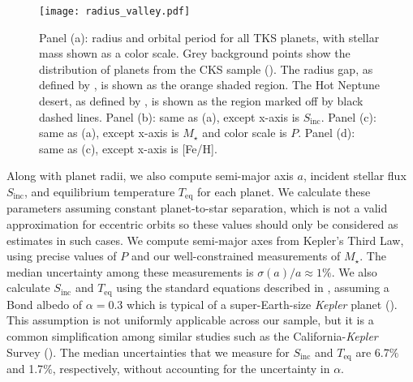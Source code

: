 \documentclass[twocolumn]{aastex63}
\begin{document}
\begin{figure*}[ht]
\centering
\texttt{[image: radius\_valley.pdf]}
\caption{Panel (a): radius and orbital period for all TKS planets, with stellar mass shown as a color scale. Grey background points show the distribution of planets from the CKS sample (\citealt{Petigura22}). The radius gap, as defined by \cite{Petigura22}, is shown as the orange shaded region. The Hot Neptune desert, as defined by \cite{Mazeh16}, is shown as the region marked off by black dashed lines. Panel (b): same as (a), except x-axis is $S_\textrm{inc}$. Panel (c): same as (a), except x-axis is $M_\star$ and color scale is $P$. Panel (d): same as (c), except x-axis is [Fe/H].}
\label{fig:radius-gap}
\end{figure*}


Along with planet radii, we also compute semi-major axis $a$, incident stellar flux $S_\textrm{inc}$, and equilibrium temperature $T_\textrm{eq}$ for each planet. We calculate these parameters assuming constant planet-to-star separation, which is not a valid approximation for eccentric orbits so these values should only be considered as estimates in such cases. We compute semi-major axes from Kepler's Third Law, using precise values of $P$ and our well-constrained measurements of $M_{\star}$. The median uncertainty among these measurements is $\sigma(a)/a \approx 1\%$. We also calculate $S_\textrm{inc}$ and $T_\textrm{eq}$ using the standard equations described in \cite{Johnson17}, assuming a Bond albedo of $\alpha = 0.3$ which is typical of a super-Earth-size \textit{Kepler} planet (\citealt{Demory14}). This assumption is not uniformly applicable across our sample, but it is a common simplification among similar studies such as the California-\textit{Kepler} Survey (\citealt{Johnson17}). The median uncertainties that we measure for $S_\textrm{inc}$ and $T_\textrm{eq}$ are 6.7$\%$ and 1.7$\%$, respectively, without accounting for the uncertainty in $\alpha$.




\end{document}
